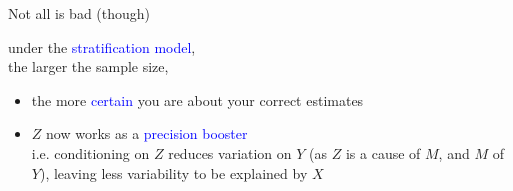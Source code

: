 %
%
\begin{lhframe}[rhgraphic={\texttt{[image: pipefork1\_samplesize3.pdf]}}]
	{Not all is bad (though)}
	
	under the \textcolor{blue}{stratification model}, \\
	the larger the sample size,
	\begin{itemize}
		\item the more \textcolor{blue}{certain} you are about your \alert{correct} estimates
		\item $Z$ now works as a \textcolor{blue}{precision booster} \\
		{\small i.e. conditioning on $Z$ reduces variation on $Y$ (as $Z$ is a cause of $M$, and $M$ of $Y$), leaving less variability to be explained by $X$}
	\end{itemize}
\end{lhframe}
%
%
